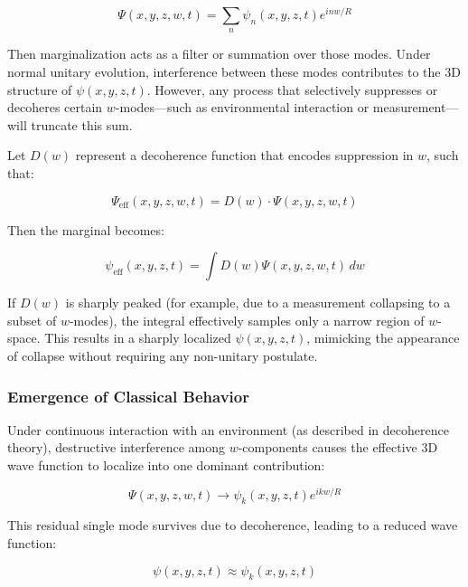\documentclass[12pt]{article}
\begin{document}
\begin{equation}
\Psi(x, y, z, w, t) = \sum_n \psi_n(x, y, z, t) e^{i n w / R}
\end{equation}

Then marginalization acts as a filter or summation over those modes. Under normal unitary evolution, interference between these modes contributes to the 3D structure of \( \psi(x, y, z, t) \). However, any process that selectively suppresses or decoheres certain \( w \)-modes—such as environmental interaction or measurement—will truncate this sum.

Let \( D(w) \) represent a decoherence function that encodes suppression in \( w \), such that:

\begin{equation}
\Psi_{\text{eff}}(x, y, z, w, t) = D(w) \cdot \Psi(x, y, z, w, t)
\end{equation}

Then the marginal becomes:

\begin{equation}
\psi_{\text{eff}}(x, y, z, t) = \int D(w) \Psi(x, y, z, w, t) \, dw
\end{equation}

If \( D(w) \) is sharply peaked (for example, due to a measurement collapsing to a subset of \( w \)-modes), the integral effectively samples only a narrow region of \( w \)-space. This results in a sharply localized \( \psi(x, y, z, t) \), mimicking the appearance of collapse without requiring any non-unitary postulate.

\subsubsection{Emergence of Classical Behavior}

Under continuous interaction with an environment (as described in decoherence theory), destructive interference among \( w \)-components causes the effective 3D wave function to localize into one dominant contribution:

\begin{equation}
\Psi(x, y, z, w, t) \to \psi_k(x, y, z, t) e^{i k w / R}
\end{equation}

This residual single mode survives due to decoherence, leading to a reduced wave function:

\begin{equation}
\psi(x, y, z, t) \approx \psi_k(x, y, z, t)
\end{equation}
\end{document}
